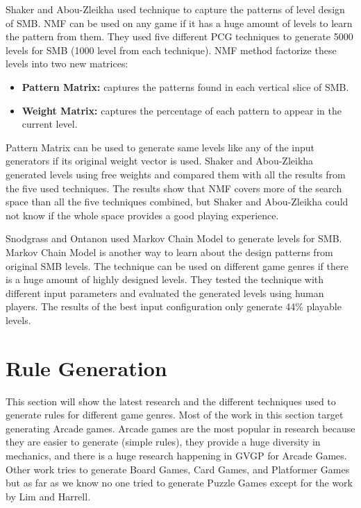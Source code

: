 Shaker and Abou-Zleikha\cite{nmfSuperMarioBros} used  technique to capture the patterns of level design of SMB. NMF can be used on any game if it has a huge amount of levels to learn the pattern from them. They used five different PCG techniques to generate 5000 levels for SMB (1000 level from each technique). NMF method factorize these levels into two new matrices:
\begin{itemize} \itemsep0pt \parskip0pt 
	\item \textbf{Pattern Matrix:} captures the patterns found in each vertical slice of SMB.
	\item \textbf{Weight Matrix:} captures the percentage of each pattern to appear in the current level.
\end{itemize}
Pattern Matrix can be used to generate same levels like any of the input generators if its original weight vector is used. Shaker and Abou-Zleikha generated levels using free weights and compared them with all the results from the five used techniques. The results show that NMF covers more of the search space than all the five techniques combined, but Shaker and Abou-Zleikha could not know if the whole space provides a good playing experience.\\\par

Snodgrass and Ontanon\cite{markovSuperMarioBros} used Markov Chain Model to generate levels for SMB. Markov Chain Model is another way to learn about the design patterns from original SMB levels. The technique can be used on different game genres if there is a huge amount of highly designed levels. They tested the technique with different input parameters and evaluated the generated levels using human players. The results of the best input configuration only generate 44\% playable levels.

\section{Rule Generation}
This section will show the latest research and the different techniques used to generate rules for different game genres. Most of the work in this section target generating Arcade games\cite{arcadeHillClimber, cookArcadeGames, romCheckFail, variationForever, gameOMatic}. Arcade games are the most popular in research because they are easier to generate (simple rules), they provide a huge diversity in mechanics, and there is a huge research happening in GVGP for Arcade Games\cite{gvgp}. Other work tries to generate Board Games\cite{evolveBrowne}, Card Games\cite{generationCardGames}, and Platformer Games\cite{mechanicMiner} but as far as we know no one tried to generate Puzzle Games except for the work by Lim and Harrell\cite{puzzleScriptGeneration}.

